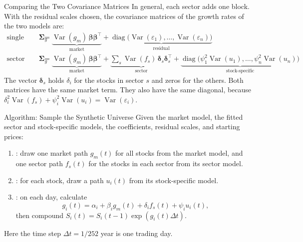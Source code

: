 \documentclass[aspectratio=169,11pt]{beamer}
\begin{document}
\begin{frame}{Comparing the Two Covariance Matrices}
  In general, each sector adds one block. With the residual scales chosen, the covariance matrices
  of the growth rates of the two models are:
  {\small\begin{align*}
    \text{single index:}\;\symbf{\Sigma}_{g} &= \underbrace{\operatorname{Var}(g_{m})\,\boldsymbol{\beta}\boldsymbol{\beta}^{\top}}_{\textstyle\text{market}} + \underbrace{\operatorname{diag}\big(\operatorname{Var}(\varepsilon_{1}),\dotsc,\operatorname{Var}(\varepsilon_{n})\big)}_{\textstyle\text{residual}}\\[4pt]
    \text{sector factor:}\;\symbf{\Sigma}_{g} &= \underbrace{\operatorname{Var}(g_{m})\,\boldsymbol{\beta}\boldsymbol{\beta}^{\top}}_{\textstyle\text{market}} + \underbrace{\textstyle\sum_{s}\operatorname{Var}(f_{s})\,\boldsymbol{\delta}_{s}\boldsymbol{\delta}_{s}^{\top}}_{\textstyle\text{sector}} + \underbrace{\operatorname{diag}\big(\psi_{1}^{2}\operatorname{Var}(u_{1}),\dotsc,\psi_{n}^{2}\operatorname{Var}(u_{n})\big)}_{\textstyle\text{stock-specific}}
  \end{align*}}%
  \noindent The vector $\boldsymbol{\delta}_s$ holds $\delta_i$ for the stocks in sector $s$ and zeros for the
  others. Both matrices have the same market term. They also have the same diagonal, because
  $\delta_i^2\operatorname{Var}(f_s)+\psi_i^2\operatorname{Var}(u_i)=\operatorname{Var}(\varepsilon_i)$.
\end{frame}

\begin{frame}{Algorithm: Sample the Synthetic Universe}
  Given the market model, the fitted sector and stock-specific models, the coefficients, residual
  scales, and starting prices:
  \begin{enumerate}\setlength{\itemsep}{0.4em}
    \item {}: draw one market path $g_m(t)$ for all stocks from the
      market model, and one sector path $f_s(t)$ for the stocks in each sector from its
      sector model.
    \item {}: for each stock, draw a path $u_i(t)$ from its
      stock-specific model.
    \item {}: on each day, calculate
      \begin{equation*}
        g_i(t)=\alpha_i+\beta_i g_m(t)+\delta_i f_s(t)+\psi_i u_i(t),
      \end{equation*}
      then compound $S_i(t)=S_i(t-1)\exp\!\left(g_i(t)\Delta t\right)$.
  \end{enumerate}
  Here the time step $\Delta t=1/252$ year is one trading day.
\end{frame}
\end{document}
